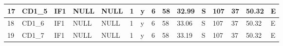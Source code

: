 {\begin{table}[]
\begin{tabular}{|l|l|l|l|l|l|l|l|l|l|l|l|l|l|l|}
		17                                & CD1\_5                                    & IF1                                       & NULL                            & NULL                            & 1                               & y                                    & 6                                                                                    & 58                                                                                   & 32.99                                                                                & S                                                                                 & 107                                                                                   & 37                                                                                    & 50.32                                                                                 & E                                                                                  \\ \hline
		18                                & CD1\_6                                    & IF1                                       & NULL                            & NULL                            & 1                               & y                                    & 6                                                                                    & 58                                                                                   & 33.06                                                                                & S                                                                                 & 107                                                                                   & 37                                                                                    & 50.32                                                                                 & E                                                                                  \\ \hline
		19                                & CD1\_7                                    & IF1                                       & NULL                            & NULL                            & 1                               & y                                    & 6                                                                                    & 58                                                                                   & 33.19                                                                                & S                                                                                 & 107                                                                                   & 37                                                                                    & 50.32                                                                                 & E                                                                                  \\ \hline

\end{tabular}
\end{table}}
